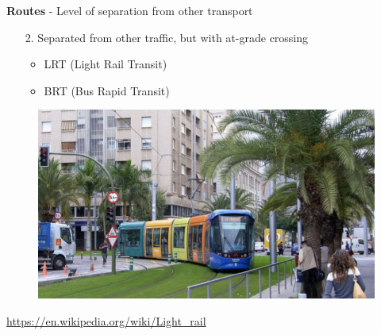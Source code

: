 \documentclass[aspectratio=169]{beamer}
\begin{document}
\begin{frame}
	
	\textbf{Routes} - Level of separation from other transport
	
	
	\begin{itemize}
		
		\item[2.] Separated from other traffic, but with at-grade crossing
		
		\begin{itemize}
			\item LRT (Light Rail Transit)
			\item BRT (Bus Rapid Transit)
		\end{itemize}
		
	\end{itemize}
	
	\begin{figure}
		\centering
		\includegraphics[width=0.7\linewidth]{images/lrt_spain.png}
	\end{figure}
	
	\tiny\url{https://en.wikipedia.org/wiki/Light_rail}
	
	
\end{frame}
\end{document}

